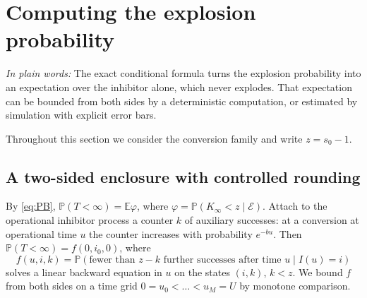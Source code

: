 \documentclass[11pt,a4paper]{article}
\numberwithin{equation}{section}
\theoremstyle{definition}\newtheorem{definition}[theorem]{Definition}
\theoremstyle{remark}\newtheorem{remark}[theorem]{Remark}\newtheorem{example}[theorem]{Example}
\newcommand{\E}{\mathbb E}
\renewcommand{\P}{\mathbb P}
\newcommand{\takeaway}[1]{\par\smallskip\noindent\textit{In plain words:} #1\par\smallskip}
\begin{document}
\section{Computing the explosion probability}\label{sec:numerics}
\takeaway{The exact conditional formula turns the explosion probability into an expectation over the inhibitor alone, which never explodes. That expectation can be bounded from both sides by a deterministic computation, or estimated by simulation with explicit error bars.}

Throughout this section we consider the conversion family and write $z=s_0-1$.

\subsection{A two-sided enclosure with controlled rounding}\label{sec:enclosure}
By \eqref{eq:PB}, $\P(T<\infty)=\E\varphi$, where $\varphi=\P(K_\infty<z\mid\mathcal E)$. Attach to the operational inhibitor process a counter $k$ of auxiliary successes: at a conversion at operational time $u$ the counter increases with probability $e^{-bu}$. Then $\P(T<\infty)=f(0,i_0,0)$, where
\[
f(u,i,k)=\P(\text{fewer than $z-k$ further successes after time $u$}\mid I(u)=i)
\]
solves a linear backward equation in $u$ on the states $(i,k)$, $k<z$. We bound $f$ from both sides on a time grid $0=u_0<\dots<u_M=U$ by monotone comparison.
\end{document}

